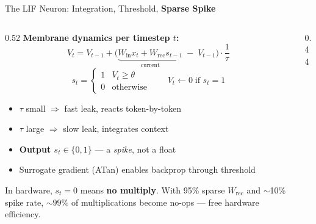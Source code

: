 \documentclass[aspectratio=169,11pt]{beamer}
\newcommand{\hl}[1]{{\color{highlight}\textbf{#1}}}
\begin{document}
\begin{frame}[shrink=12]{The LIF Neuron: Integration, Threshold, \hl{Sparse Spike}}
\begin{columns}[T]
\begin{column}{0.52\textwidth}
  \textbf{Membrane dynamics per timestep $t$:}
  \[
    V_t = V_{t-1} + \bigl(\underbrace{W_\text{in}x_t + W_\text{rec}s_{t-1}}_{\text{current}}\;
          - \;V_{t-1}\bigr)\cdot\frac{1}{\tau}
  \]
  \[
    s_t = \begin{cases}1 & V_t \geq \theta\\0 & \text{otherwise}\end{cases}
    \qquad V_t \leftarrow 0\;\text{if } s_t{=}1
  \]
  \vspace{0.3em}
  \begin{itemize}
    \item $\tau$ small $\Rightarrow$ fast leak, reacts token-by-token
    \item $\tau$ large $\Rightarrow$ slow leak, integrates context
    \item \hl{Output $s_t \in \{0,1\}$} — a \emph{spike}, not a float
    \item Surrogate gradient (ATan) enables backprop through threshold
  \end{itemize}
  \vspace{0.15em}
  \begin{tcolorbox}[mybox,title=Why sparsity matters]
    \scriptsize In hardware, $s_t{=}0$ means \textbf{no multiply}.
    With 95\% sparse $W_\text{rec}$ and $\sim$10\% spike rate,
    ${\sim}99\%$ of multiplications become no-ops — free hardware efficiency.
  \end{tcolorbox}
\end{column}
\begin{column}{0.44\textwidth}
\end{column}
\end{columns}
\end{frame}
\end{document}
